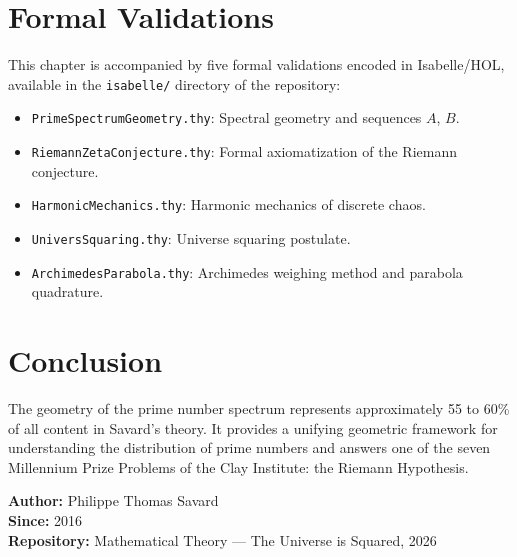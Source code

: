 \documentclass[12pt,a4paper]{article}
\begin{document}
\section{Formal Validations}

This chapter is accompanied by five formal validations encoded in Isabelle/HOL,
available in the \texttt{isabelle/} directory of the repository:

\begin{itemize}
  \item \texttt{PrimeSpectrumGeometry.thy}: Spectral geometry and sequences $A$, $B$.
  \item \texttt{RiemannZetaConjecture.thy}: Formal axiomatization of the Riemann conjecture.
  \item \texttt{HarmonicMechanics.thy}: Harmonic mechanics of discrete chaos.
  \item \texttt{UniversSquaring.thy}: Universe squaring postulate.
  \item \texttt{ArchimedesParabola.thy}: Archimedes weighing method and parabola quadrature.
\end{itemize}

\section{Conclusion}

The geometry of the prime number spectrum represents approximately 55 to 60\% of all
content in Savard's theory. It provides a unifying geometric framework for understanding
the distribution of prime numbers and answers one of the seven Millennium Prize Problems
of the Clay Institute: the Riemann Hypothesis.

\bigskip
\noindent\textbf{Author:} Philippe Thomas Savard\\
\noindent\textbf{Since:} 2016\\
\noindent\textbf{Repository:} Mathematical Theory — The Universe is Squared, 2026
\end{document}
